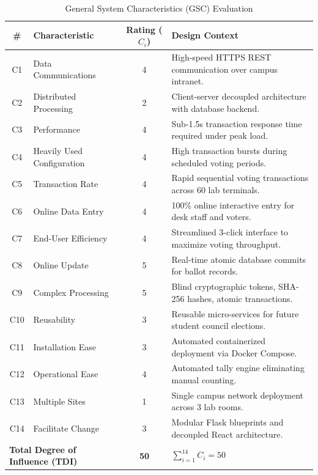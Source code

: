 \documentclass[12pt,a4paper,oneside]{report}
\begin{document}
\begin{table}[H]
    \centering
    \caption{General System Characteristics (GSC) Evaluation}
    \label{tab:gsc_table}
    \begin{tabular}{clc p{8.5cm}}
        \toprule
        \textbf{\#} & \textbf{Characteristic} & \textbf{Rating ($C_i$)} & \textbf{Design Context} \\
        \midrule
        C1 & Data Communications & 4 & High-speed HTTPS REST communication over campus intranet. \\
        C2 & Distributed Processing & 2 & Client-server decoupled architecture with database backend. \\
        C3 & Performance & 4 & Sub-1.5s transaction response time required under peak load. \\
        C4 & Heavily Used Configuration & 4 & High transaction bursts during scheduled voting periods. \\
        C5 & Transaction Rate & 4 & Rapid sequential voting transactions across 60 lab terminals. \\
        C6 & Online Data Entry & 4 & 100\% online interactive entry for desk staff and voters. \\
        C7 & End-User Efficiency & 4 & Streamlined 3-click interface to maximize voting throughput. \\
        C8 & Online Update & 5 & Real-time atomic database commits for ballot records. \\
        C9 & Complex Processing & 5 & Blind cryptographic tokens, SHA-256 hashes, atomic transactions. \\
        C10 & Reusability & 3 & Reusable micro-services for future student council elections. \\
        C11 & Installation Ease & 3 & Automated containerized deployment via Docker Compose. \\
        C12 & Operational Ease & 4 & Automated tally engine eliminating manual counting. \\
        C13 & Multiple Sites & 1 & Single campus network deployment across 3 lab rooms. \\
        C14 & Facilitate Change & 3 & Modular Flask blueprints and decoupled React architecture. \\
        \midrule
        \multicolumn{2}{l}{\textbf{Total Degree of Influence (TDI)}} & \textbf{50} & $\sum_{i=1}^{14} C_i = 50$ \\
        \bottomrule
    \end{tabular}
\end{table}
\end{document}

